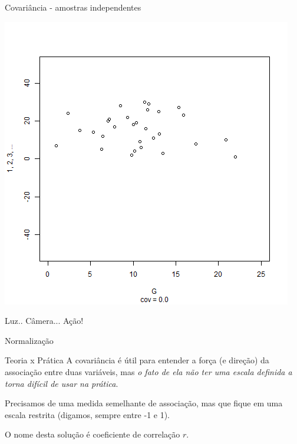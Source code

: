 \documentclass{beamer}
\begin{document}
\begin{frame}{Covariância - amostras independentes}
  \begin{center}
    \includegraphics[height=.8\textheight]{Cap17/anim-n}
  \end{center}
\end{frame}

\begin{frame}{Luz.. Câmera... Ação!}
  \begin{center}
  \end{center}
\end{frame}

\begin{frame}{Normalização}
  \begin{block}{Teoria x Prática}
    A covariância é útil para entender a força (e direção) da associação entre duas variáveis, mas {\em o fato de ela não ter uma escala definida a torna difícil de usar na prática}.

    \bigskip
    Precisamos de uma medida semelhante de associação, mas que fique em uma escala restrita (digamos, sempre entre -1 e 1).
  \end{block}

  \bigskip
  O nome desta solução é \alert{coeficiente de correlação} $r$.
  
\end{frame}
\end{document}

